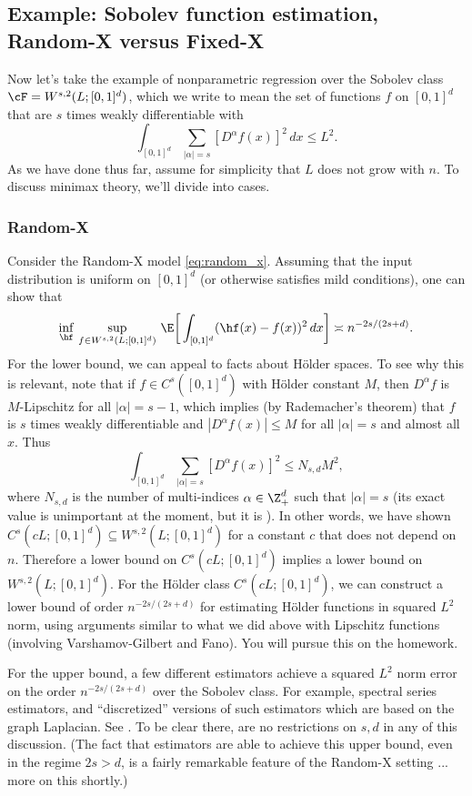 \documentclass{article}
\begin{document}
\subsection{Example: Sobolev function estimation, Random-X versus Fixed-X}   

Now let's take the example of nonparametric regression over the Sobolev class
$\cF = W^{s,2}(L; [0,1]^d)$, which we write to mean the set of functions $f$ on
$[0,1]^d$ that are $s$ times weakly differentiable with    
\[
\int_{[0,1]^d} \sum_{|\alpha| = s} [D^\alpha f(x)]^2 \, dx \leq L^2.
\]
As we have done thus far, assume for simplicity that $L$ does not grow with
$n$. To discuss minimax theory, we'll divide into cases.

\subsubsection{Random-X}

Consider the Random-X model \eqref{eq:random_x}. Assuming that the input
distribution is uniform on $[0,1]^d$ (or otherwise satisfies mild conditions),
one can show that 
\[
\inf_{\hf} \, \sup_{f \in W^{s,2}(L; [0,1]^d)} \, \E \bigg[ \int_{[0,1]^d}
(\hf(x) - f(x))^2 \, dx \bigg] \asymp n^{-2s/(2s+d)}.
\]
For the lower bound, we can appeal to facts about H{\"o}lder spaces. To see why
this is relevant, note that if $f \in C^s([0,1]^d)$ with H{\"o}lder constant
$M$, then $D^\alpha f$ is $M$-Lipschitz for all $|\alpha| = s-1$, which implies
(by Rademacher's theorem) that $f$ is $s$ times weakly differentiable and
$|D^\alpha f(x)| \leq M$ for all $|\alpha| = s$ and almost all $x$. Thus  
\[
\int_{[0,1]^d} \sum_{|\alpha| = s} [D^\alpha f(x)]^2 \leq N_{s,d} M^2,
\]
where $N_{s,d}$ is the number of multi-indices $\alpha \in \Z^d_+$ such that
$|\alpha| = s$ (its exact value is unimportant at the moment, but it is
). In other words, we have shown $C^s(cL;
[0,1]^d) \subseteq W^{s,2}(L; [0,1]^d)$ for a constant $c$ that does not depend
on $n$. Therefore a lower bound on $C^s(cL; [0,1]^d)$ implies a lower bound on
$W^{s,2}(L; [0,1]^d)$. For the H{\"o}lder class $C^s(cL; [0,1]^d)$, we can 
construct a lower bound of order $n^{-2s/(2s+d)}$ for estimating H{\"o}lder
functions in squared $L^2$ norm, using arguments similar to what we did above
with Lipschitz functions (involving Varshamov-Gilbert and Fano).  You will
pursue this on the homework.

For the upper bound, a few different estimators achieve a squared $L^2$ norm 
error on the order $n^{-2s/(2s+d)}$ over the Sobolev class. For example,
spectral series estimators, and ``discretized'' versions of such estimators
which are based on the graph Laplacian. See \citet{green2023minimax}. To be 
clear there, are no restrictions on $s,d$ in any of this discussion. (The fact
that estimators are able to achieve this upper bound, even in the regime $2s >
d$, is a fairly remarkable feature of the Random-X setting ... more on this
shortly.)   
\end{document}
